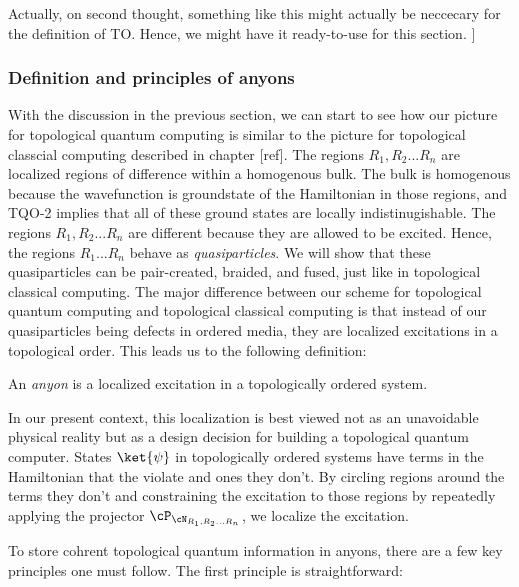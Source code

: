 Actually, on second thought, something like this might actually be neccecary for the definition of TO. Hence, we might have it ready-to-use for this section.
]


\subsubsection{Definition and principles of anyons}

With the discussion in the previous section, we can start to see how our picture for topological quantum computing is similar to the picture for topological classcial computing described in chapter [ref]. The regions $R_1,R_2... R_n$ are localized regions of difference within a homogenous bulk. The bulk is homogenous because the wavefunction is groundstate of the Hamiltonian in those regions, and TQO-2 implies that all of these ground states are locally indistinugishable. The regions $R_1,R_2... R_n$ are different because they are allowed to be excited. Hence, the regions $R_1... R_n$ behave as \textit{quasiparticles}. We will show that these quasiparticles can be pair-created, braided, and fused, just like in topological classical computing. The major difference between our scheme for topological quantum computing and topological classical computing is that instead of our quasiparticles being defects in ordered media, they are localized excitations in a topological order. This leads us to the following definition:

\begin{defn} An \textit{anyon} is a localized excitation in a topologically ordered system.
\end{defn}

In our present context, this localization is best viewed not as an unavoidable physical reality but as a design decision for building a topological quantum computer. States $\ket{\psi}$ in topologically ordered systems have terms in the Hamiltonian that the violate and ones they don't. By circling regions around the terms they don't and constraining the excitation to those regions by repeatedly applying the projector $\cP_{\cN_{R_1,R_2... R_n}}$, we localize the excitation.

To store cohrent topological quantum information in anyons, there are a few key principles one must follow. The first principle is straightforward:

\begin{center}
\end{center}


